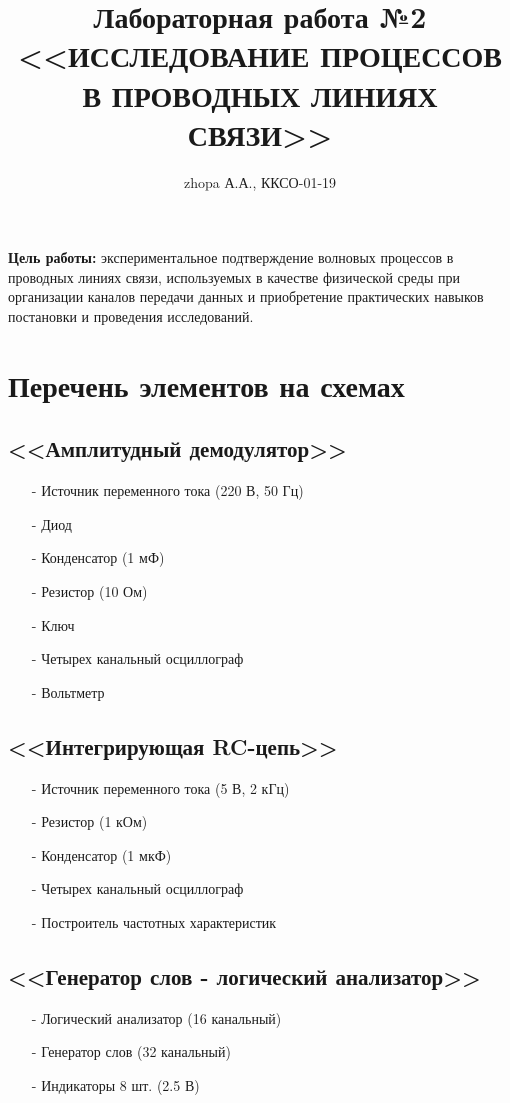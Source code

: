 \documentclass[11pt]{article}
\title{\textbf{Лабораторная работа №2\\<<ИССЛЕДОВАНИЕ ПРОЦЕССОВ В ПРОВОДНЫХ ЛИНИЯХ СВЯЗИ>>}}
\author{zhopa А.А., ККСО-01-19}
\date{}
\begin{document}
\maketitle
\thispagestyle{empty}
\textbf{Цель работы:} экспериментальное подтверждение волновых процессов в проводных линиях связи, используемых в качестве физической среды при организации каналов передачи данных и приобретение практических навыков постановки и проведения исследований.
\section{Перечень элементов на схемах}
\subsection{<<Амплитудный демодулятор>>}
\begin{itemize}
    \item[-] Источник переменного тока (220 В, 50 Гц)
    \item[-] Диод
    \item[-] Конденсатор (1 мФ)
    \item[-] Резистор (10 Ом)
    \item[-] Ключ
    \item[-] Четырех канальный осциллограф
    \item[-] Вольтметр
\end{itemize}
\subsection{<<Интегрирующая RC-цепь>>}
\begin{itemize}
    \item[-] Источник переменного тока (5 В, 2 кГц)
    \item[-] Резистор (1 кОм)
    \item[-] Конденсатор (1 мкФ)
    \item[-] Четырех канальный осциллограф
    \item[-] Построитель частотных характеристик
\end{itemize}
\subsection{<<Генератор слов - логический анализатор>>}
\begin{itemize}
    \item[-] Логический анализатор (16 канальный)
    \item[-] Генератор слов (32 канальный)
    \item[-] Индикаторы 8 шт. (2.5 В)
\end{itemize}
\end{document}
